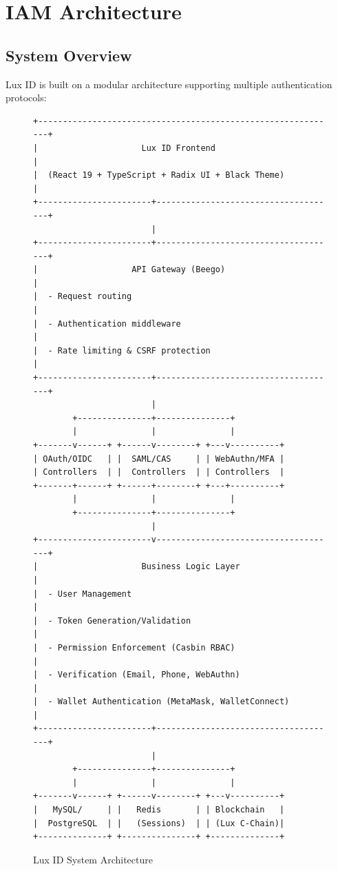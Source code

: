 \section{IAM Architecture}


\subsection{System Overview}

Lux ID is built on a modular architecture supporting multiple authentication protocols:

\begin{figure}[h]
\centering
\begin{verbatim}
+-------------------------------------------------------------+
|                     Lux ID Frontend                         |
|  (React 19 + TypeScript + Radix UI + Black Theme)          |
+-----------------------+-------------------------------------+
                        |
+-----------------------+-------------------------------------+
|                   API Gateway (Beego)                       |
|  - Request routing                                          |
|  - Authentication middleware                                |
|  - Rate limiting & CSRF protection                          |
+-----------------------+-------------------------------------+
                        |
        +---------------+---------------+
        |               |               |
+-------v------+ +------v--------+ +---v----------+
| OAuth/OIDC   | |  SAML/CAS     | | WebAuthn/MFA |
| Controllers  | |  Controllers  | | Controllers  |
+-------+------+ +------+--------+ +---+----------+
        |               |               |
        +---------------+---------------+
                        |
+-----------------------v-------------------------------------+
|                     Business Logic Layer                    |
|  - User Management                                          |
|  - Token Generation/Validation                              |
|  - Permission Enforcement (Casbin RBAC)                     |
|  - Verification (Email, Phone, WebAuthn)                    |
|  - Wallet Authentication (MetaMask, WalletConnect)          |
+-----------------------+-------------------------------------+
                        |
        +---------------+---------------+
        |               |               |
+-------v------+ +------v--------+ +---v----------+
|   MySQL/     | |   Redis       | | Blockchain   |
|  PostgreSQL  | |   (Sessions)  | | (Lux C-Chain)|
+--------------+ +---------------+ +--------------+
\end{verbatim}
\caption{Lux ID System Architecture}
\end{figure}

